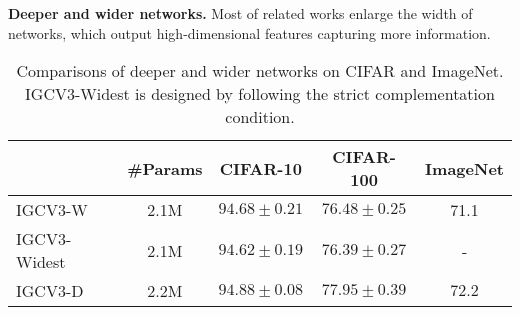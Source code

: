 \documentclass{bmvc2k}
\begin{document}
	\noindent\textbf{Deeper and wider networks.}\label{deep_wider} Most of related works enlarge the width of networks, which output high-dimensional features capturing more information. 
	\begin{table}[htb!]
		\centering
		\begin{tabular}{|l||c|c|c|c|}
			\hline
			&\#Params& CIFAR-10& CIFAR-100 &ImageNet\\
			\hline\hline
			IGCV$3$-W & 2.1M   & $94.68\pm0.21$   & $76.48\pm0.25$     & 71.1 \\
			IGCV$3$-Widest & 2.1M   & $94.62\pm0.19$   & $76.39\pm0.27$     & - \\
			IGCV$3$-D & 2.2M     & $\mathbf{94.88\pm0.08}$   &   $\mathbf{77.95\pm0.39}$   &$\mathbf{72.2}$\\
			\hline
		\end{tabular}
		\caption{Comparisons of deeper and wider networks on CIFAR and ImageNet. IGCV$3$-Widest is designed by following the strict complementation condition.} %
		\label{wd_dp}
	\end{table}
	
\end{document}
